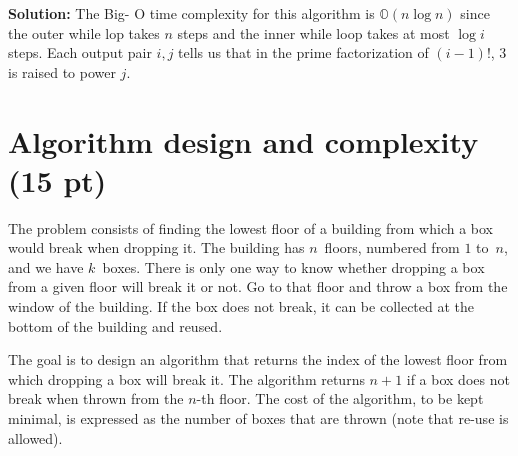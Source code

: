 \documentclass{article}
\begin{document}
	\begin{tcolorbox}
            	\textbf{Solution:} The Big- O time complexity for this algorithm is $\mathbb{O}(n \log n)$ since the outer while lop takes $n$ steps and the inner while loop takes at most $\log i$ steps.  Each output pair $i, j$ tells us that in the prime factorization of $(i-1)!$, $3$ is raised to power $j$.
	\end{tcolorbox}

\section{Algorithm design and complexity (15 pt)}

The problem consists of finding the lowest floor of a building from
which a box would break when dropping it. The building has $n$~floors,
numbered from $1$ to~$n$, and we have $k$~boxes. There is only one way
to know whether dropping a box from a given floor will break it or
not. Go to that floor and throw a box
from the window of the building. If the box does not break, it can be
collected at the bottom of the building and reused.

The goal is to design an algorithm that returns the index of the lowest floor from
which dropping a box will break it. The algorithm returns $n+1$ if a box does
not break when thrown from the $n$-th floor. The cost of the algorithm, to be kept minimal, is expressed
as the number of boxes that are thrown (note that re-use is allowed).
\end{document}
